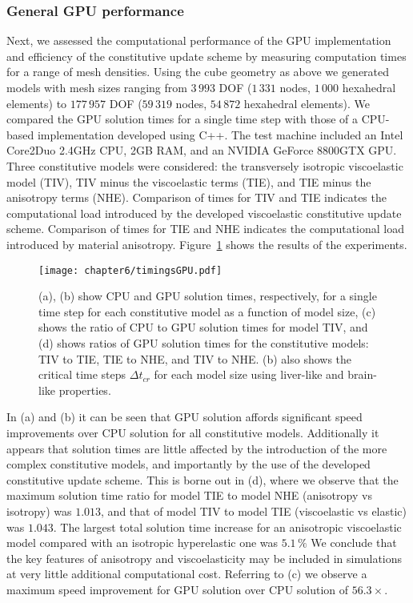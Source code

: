 		\subsubsection*{General GPU performance}
Next, we assessed the computational performance of the GPU implementation and efficiency of the constitutive update scheme by measuring computation times for a range of mesh densities. Using the cube geometry as above we generated models with mesh sizes ranging from $3\,993$ DOF ($1\,331$ nodes, $1\,000$ hexahedral elements) to $177\,957$ DOF ($59\,319$ nodes, $54\,872$ hexahedral elements). We compared the GPU solution times for a single time step with those of a CPU-based implementation developed using C++. The test machine included an Intel Core2Duo 2.4GHz CPU, 2GB RAM, and an NVIDIA GeForce 8800GTX GPU. Three constitutive models were considered: the transversely isotropic viscoelastic model (TIV), TIV minus the viscoelastic terms (TIE), and TIE minus the anisotropy terms (NHE). Comparison of times for TIV and TIE indicates the computational load introduced by the developed viscoelastic constitutive update scheme. Comparison of times for TIE and NHE indicates the computational load introduced by material anisotropy. Figure~\ref{chap6:fig-timingsGPU} shows the results of the experiments. 
%
\begin{figure}[ht]
\begin{center}
\texttt{[image: chapter6/timingsGPU.pdf]}
\end{center}
\caption[GPU solution times]{(a), (b) show CPU and GPU solution times, respectively, for a single time step for each constitutive model as a function of model size, (c) shows the ratio of CPU to GPU solution times for model TIV, and (d) shows ratios of GPU solution times for the constitutive models: TIV to TIE, TIE to NHE, and TIV to NHE. (b) also shows the critical time steps $ \Delta t_{cr} $ for each model size using liver-like and brain-like properties.} 
\label{chap6:fig-timingsGPU}
\end{figure}
	
In (a) and (b) it can be seen that GPU solution affords significant speed improvements over CPU solution for all constitutive models. Additionally it appears that solution times are little affected by the introduction of the more complex constitutive models, and importantly by the use of the developed constitutive update scheme. This is borne out in (d), where we observe that the maximum solution time ratio for model TIE to model NHE (anisotropy vs isotropy) was $1.013$, and that of model TIV to model TIE (viscoelastic vs elastic) was $1.043$. The largest total solution time increase for an anisotropic viscoelastic model compared with an isotropic hyperelastic one was $5.1\, \%$ We conclude that the key features of anisotropy and viscoelasticity may be included in simulations at very little additional computational cost. Referring to (c) we observe a maximum speed improvement for GPU solution over CPU solution of $56.3 \times$. 
	
